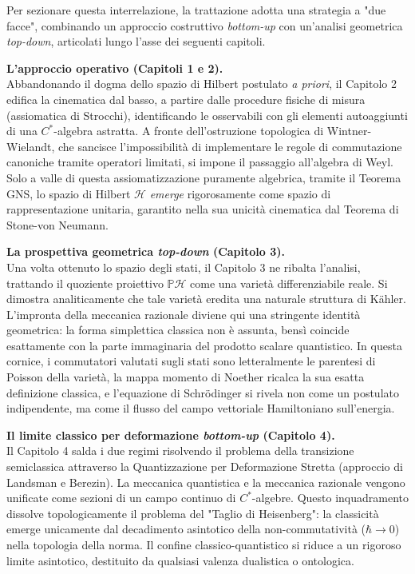 \documentclass[12pt, a4paper]{article}
\begin{document}
	Per sezionare questa interrelazione, la trattazione adotta una strategia a "due facce", combinando un approccio costruttivo \textit{bottom-up} con un'analisi geometrica \textit{top-down}, articolati lungo l'asse dei seguenti capitoli.
	
	\medskip
	
	\textbf{L'approccio operativo (Capitoli 1 e 2).} \\
	Abbandonando il dogma dello spazio di Hilbert postulato \textit{a priori}, il Capitolo 2 edifica la cinematica dal basso, a partire dalle procedure fisiche di misura (assiomatica di Strocchi), identificando le osservabili con gli elementi autoaggiunti di una $C^*$-algebra astratta. A fronte dell'ostruzione topologica di Wintner-Wielandt, che sancisce l'impossibilità di implementare le regole di commutazione canoniche tramite operatori limitati, si impone il passaggio all'algebra di Weyl. Solo a valle di questa assiomatizzazione puramente algebrica, tramite il Teorema GNS, lo spazio di Hilbert $\mathcal{H}$ \textit{emerge} rigorosamente come spazio di rappresentazione unitaria, garantito nella sua unicità cinematica dal Teorema di Stone-von Neumann.
	
	\medskip
	
	\textbf{La prospettiva geometrica \textit{top-down} (Capitolo 3).} \\
	Una volta ottenuto lo spazio degli stati, il Capitolo 3 ne ribalta l'analisi, trattando il quoziente proiettivo $\mathbb{P}\mathcal{H}$ come una varietà differenziabile reale. Si dimostra analiticamente che tale varietà eredita una naturale struttura di Kähler. L'impronta della meccanica razionale diviene qui una stringente identità geometrica: la forma simplettica classica non è assunta, bensì coincide esattamente con la parte immaginaria del prodotto scalare quantistico. In questa cornice, i commutatori valutati sugli stati sono letteralmente le parentesi di Poisson della varietà, la mappa momento di Noether ricalca la sua esatta definizione classica, e l'equazione di Schrödinger si rivela non come un postulato indipendente, ma come il flusso del campo vettoriale Hamiltoniano sull'energia.
	
	\medskip
	
	\textbf{Il limite classico per deformazione \textit{bottom-up} (Capitolo 4).} \\
	Il Capitolo 4 salda i due regimi risolvendo il problema della transizione semiclassica attraverso la Quantizzazione per Deformazione Stretta (approccio di Landsman e Berezin). La meccanica quantistica e la meccanica razionale vengono unificate come sezioni di un campo continuo di $C^*$-algebre. Questo inquadramento dissolve topologicamente il problema del "Taglio di Heisenberg": la classicità emerge unicamente dal decadimento asintotico della non-commutatività ($\hbar \to 0$) nella topologia della norma. Il confine classico-quantistico si riduce a un rigoroso limite asintotico, destituito da qualsiasi valenza dualistica o ontologica.
	
\end{document}
